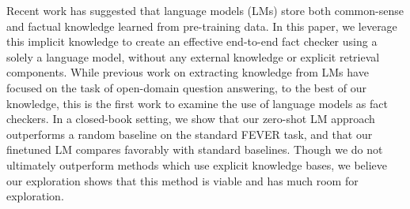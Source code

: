 Recent work has suggested that language models (LMs) store both common-sense and factual knowledge learned from pre-training data. In this paper, we leverage this implicit knowledge to create an effective end-to-end fact checker using a solely a language model, without any external knowledge or explicit retrieval components. While previous work on extracting knowledge from LMs have focused on the task of open-domain question answering, to the best of our knowledge, this is the first work to examine the use of language models as fact checkers. In a closed-book setting, we show that our zero-shot LM approach outperforms a random baseline on the standard FEVER task, and that our finetuned LM compares favorably with standard baselines. Though we do not ultimately outperform methods which use explicit knowledge bases, we believe our exploration shows that this method is viable and has much room for exploration.
